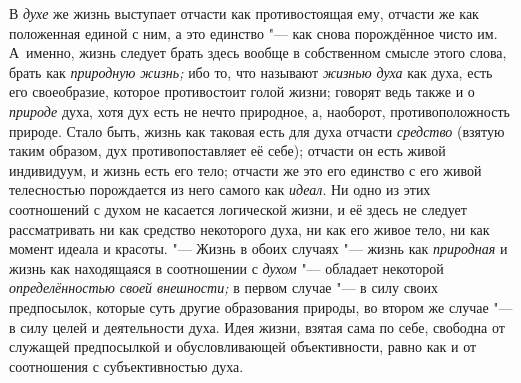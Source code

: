 В {\em духе} же жизнь выступает отчасти как противостоящая ему, отчасти же
как положенная единой с ним, а это единство "--- как снова
порождённое чисто им. А~именно, жизнь следует брать здесь вообще в
собственном смысле этого слова, брать как
{\em природную жизнь;} ибо то, что называют {\em жизнью духа} как
духа, есть его своеобразие, которое противостоит голой жизни; говорят ведь
также и о {\em природе}
духа, хотя дух есть не нечто природное, а, наоборот,
противоположность природе. Стало быть, жизнь как таковая есть для духа
отчасти {\em средство}
(взятую таким образом, дух противопоставляет её себе);
отчасти он есть живой индивидуум, и жизнь есть его тело; отчасти же это его
единство с его живой телесностью порождается из него самого как
{\em идеал}. Ни одно из
этих соотношений с духом не касается логической жизни, и её здесь не
следует рассматривать ни как средство некоторого духа, ни как его живое
тело, ни как момент идеала и красоты. "--- Жизнь в обоих
случаях "--- жизнь как {\em природная} и жизнь
как находящаяся в соотношении с {\em духом} "--- обладает
некоторой {\em определённостью своей
внешности;} в первом случае "--- в силу своих
предпосылок, которые суть другие образования природы, во втором же случае
"--- в силу целей и деятельности духа. Идея жизни, взятая сама
по себе, свободна от служащей предпосылкой и обусловливающей объективности,
равно как и от соотношения с субъективностью духа.

